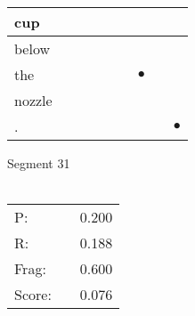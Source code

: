 \documentclass[landscape]{article}
\newcommand{\ssp}{\hspace{2pt}}
\newcommand{\mex}{\cellcolor{g}$\bullet$}
\begin{document}
\begin{tabular}{|l|p{10pt}|p{10pt}|p{10pt}|p{10pt}|p{10pt}|p{10pt}|p{10pt}|p{10pt}|}
\hline
\ssp cup \ssp&\hspace{2pt}&\hspace{2pt}&\hspace{2pt}&\hspace{2pt}&\hspace{2pt}&\hspace{2pt}&\hspace{2pt}&\hspace{2pt}\\
\hline
\ssp below \ssp&\hspace{2pt}&\hspace{2pt}&\hspace{2pt}&\hspace{2pt}&\hspace{2pt}&\hspace{2pt}&\hspace{2pt}&\hspace{2pt}\\
\hline
\ssp \cellcolor{ref5}the \ssp&\hspace{2pt}&\hspace{2pt}&\hspace{2pt}&\hspace{2pt}&\hspace{2pt}&\hspace{2pt}\mex&\hspace{2pt}&\hspace{2pt}\\
\hline
\ssp nozzle \ssp&\hspace{2pt}&\hspace{2pt}&\hspace{2pt}&\hspace{2pt}&\hspace{2pt}&\hspace{2pt}&\hspace{2pt}&\hspace{2pt}\\
\hline
\ssp \cellcolor{ref7}. \ssp&\hspace{2pt}&\hspace{2pt}&\hspace{2pt}&\hspace{2pt}&\hspace{2pt}&\hspace{2pt}&\hspace{2pt}&\hspace{2pt}\mex\\
\hline
\end{tabular}

\vspace{6pt}
\noindent Segment 31\\\\
\noindent\begin{tabular}{lm{12pt}r}
\hline
P:&&0.200\\
R:&&0.188\\
Frag:&&0.600\\
Score:&&0.076\\
\end{tabular}
\end{document}
